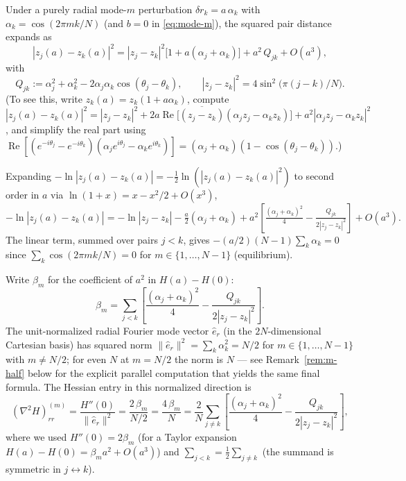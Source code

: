 \documentclass[11pt]{article}
\theoremstyle{remark}
\begin{document}
Under a purely radial mode-$m$ perturbation
$\delta r_k = a\,\alpha_k$ with $\alpha_k = \cos(2\pi m k / N)$
(and $b = 0$ in \eqref{eq:mode-m}), the squared pair distance expands as
\begin{equation}\label{eq:pair-expand}
  |z_j(a) - z_k(a)|^2
  = |z_j - z_k|^2 \bigl[1 + a(\alpha_j + \alpha_k)\bigr]
    + a^2\,Q_{jk} + O(a^3),
\end{equation}
with
\[
  Q_{jk} := \alpha_j^2 + \alpha_k^2
            - 2 \alpha_j \alpha_k \cos(\theta_j - \theta_k),
  \qquad
  |z_j - z_k|^2 = 4 \sin^2\!\bigl(\pi(j-k)/N\bigr).
\]
(To see this, write $z_k(a) = z_k(1 + a\alpha_k)$, compute
$|z_j(a) - z_k(a)|^2 = |z_j - z_k|^2 + 2 a \operatorname{Re}\bigl[\overline{(z_j-z_k)}(\alpha_j z_j - \alpha_k z_k)\bigr] + a^2 |\alpha_j z_j - \alpha_k z_k|^2$,
and simplify the real part using
$\operatorname{Re}[(e^{-i\theta_j} - e^{-i\theta_k})(\alpha_j e^{i\theta_j} - \alpha_k e^{i\theta_k})]
 = (\alpha_j + \alpha_k)(1 - \cos(\theta_j - \theta_k))$.)

Expanding $-\ln|z_j(a) - z_k(a)| = -\tfrac12 \ln(|z_j(a) - z_k(a)|^2)$ to
second order in $a$ via $\ln(1 + x) = x - x^2/2 + O(x^3)$,
\begin{equation}\label{eq:log-expand}
  -\ln|z_j(a) - z_k(a)|
   = -\ln|z_j - z_k|
     - \tfrac{a}{2}(\alpha_j + \alpha_k)
     + a^2\!\left[\tfrac{(\alpha_j + \alpha_k)^2}{4}
                  - \tfrac{Q_{jk}}{2 |z_j - z_k|^2}\right] + O(a^3).
\end{equation}
The linear term, summed over pairs $j < k$, gives
$-(a/2)(N-1)\sum_k \alpha_k = 0$ since $\sum_k \cos(2\pi m k/N) = 0$ for
$m \in \{1, \ldots, N-1\}$ (equilibrium).

Write $\beta_m$ for the coefficient of $a^2$ in $H(a) - H(0)$:
\[
  \beta_m = \sum_{j<k}\!\left[\frac{(\alpha_j + \alpha_k)^2}{4}
                              - \frac{Q_{jk}}{2 |z_j - z_k|^2}\right].
\]
The unit-normalized radial Fourier mode vector $\hat{e}_r$ (in the
$2N$-dimensional Cartesian basis) has squared norm
$\|\hat{e}_r\|^2 = \sum_k \alpha_k^2 = N/2$ for $m \in \{1, \ldots, N-1\}$
with $m \ne N/2$; for even $N$ at $m = N/2$ the norm is $N$ — see
Remark~\ref{rem:m-half} below for the explicit parallel computation
that yields the same final formula.
The Hessian entry in this normalized direction is
\begin{equation}\label{eq:rr-norm}
  (\nabla^2 H)_{rr}^{(m)}
     = \frac{H''(0)}{\|\hat{e}_r\|^2}
     = \frac{2\,\beta_m}{N/2}
     = \frac{4\,\beta_m}{N}
     = \frac{2}{N}\sum_{j \ne k}\!\left[\frac{(\alpha_j + \alpha_k)^2}{4}
                                        - \frac{Q_{jk}}{2 |z_j - z_k|^2}\right],
\end{equation}
where we used $H''(0) = 2\beta_m$ (for a Taylor expansion
$H(a) - H(0) = \beta_m a^2 + O(a^3)$) and
$\sum_{j<k} = \tfrac12 \sum_{j \ne k}$ (the summand is symmetric in
$j \leftrightarrow k$).
\end{document}
